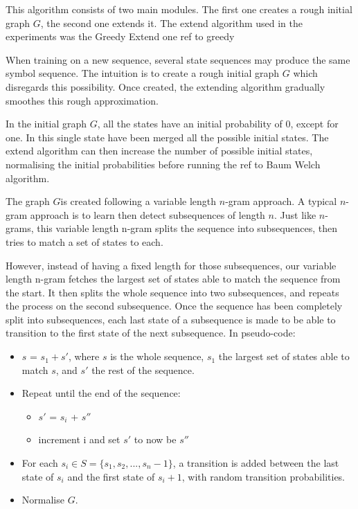 This algorithm consists of two main modules. The first one creates a rough initial graph $G$, the second one extends it. The extend algorithm used in the experiments was the Greedy Extend one {ref to greedy}%

When training on a new sequence, several state sequences may produce the same symbol sequence. The intuition is to create a rough initial graph $G$ which disregards this possibility. Once created, the extending algorithm gradually smoothes this rough approximation.

In the initial graph $G$, all the states have an initial probability of 0, except for one. In this single state have been merged all the possible initial states. The extend algorithm can then increase the number of possible initial states, normalising the initial probabilities before running the {ref to Baum Welch} algorithm.

The graph $G$is created following a variable length $n$-gram approach. A typical $n$-gram approach is to learn then detect subsequences of length $n$. Just like $n$-grams, this variable length n-gram splits the sequence into subsequences, then tries to match a set of states to each.

However, instead of having a fixed length for those subsequences, our variable length n-gram fetches the largest set of states able to match the sequence from the start. It then splits the whole sequence into two subsequences, and repeats the process on the second subsequence. Once the sequence has been completely split into subsequences, each last state of a subsequence is made to be able to transition to the first state of the next subsequence. In pseudo-code:

\begin{itemize}
	\item $s$ = $s_1 + s'$, where $s$ is the whole sequence, $s_1$ the largest set of states able to match $s$, and $s'$ the rest of the sequence.
	\item Repeat until the end of the sequence:
	\begin{itemize}
		\item $s'$ = $s_i$ + $s''$
		\item increment i and set $s'$ to now be $s''$
	\end{itemize}
	\item For each $s_i \in S = \{s_1, s_2, ... , s_n-1\}$, a transition is added between the last state of $s_i$ and the first state of $s_i+1$, with random transition probabilities.
	\item Normalise $G$.
\end{itemize}

